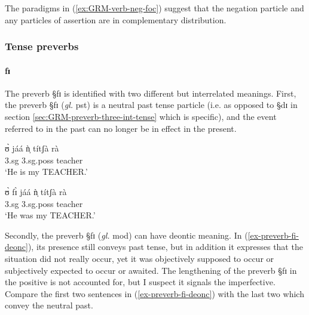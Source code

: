The paradigms in (\ref{ex:GRM-verb-neg-foc})  suggest
that the negation particle and any particles of assertion are in complementary
distribution. 





\subsubsection{Tense preverbs}
\label{sec:GRM-verb-neg}


\paragraph{fɪ}

The preverb {\S fɪ}   is identified with two different but interrelated
meanings.  First, the preverb {\S fɪ}  ({\it gl.} {\sc pst}) is a neutral
past tense particle (i.e.  as opposed to {\S dɪ} in  section
\ref{sec:GRM-preverb-three-int-tense} which is specific), and the event referred
to in the past can no longer be in effect in the present.

\begin{exe} 
\ex\label{ex-preverb-fi-neut}
\begin{xlist}
\ex
\gll ʊ̀ jáá  ǹ̩ títʃà rà \\
  {\sc 3.sg} {\ident}    {\sc 3.sg.poss}  teacher {\foc}  \\
\glt  `He is my TEACHER.' 

\ex
\gll   ʊ̀  fɪ̀ jáá  ǹ̩ títʃà rà\\
        {\sc 3.sg} {\pst} {\ident}    {\sc 3.sg.poss}  teacher {\foc}  \\  
\glt  `He was my TEACHER.' 

\end{xlist}
\end{exe} 

 Secondly, the preverb {\S fɪ}   ({\it gl.} {\sc mod}) can have  deontic
meaning.  In (\ref{ex-preverb-fi-deonc}),  its presence still conveys  past
tense, but in addition it expresses that the situation did not really occur, yet
it was objectively supposed to occur or subjectively expected to occur or
awaited. The lengthening of the preverb {\S fɪ} in the positive  is not
accounted for, but I suspect it  signals the imperfective. Compare the first two
sentences in (\ref{ex-preverb-fi-deonc}) with the last two  which convey the
neutral past. 



